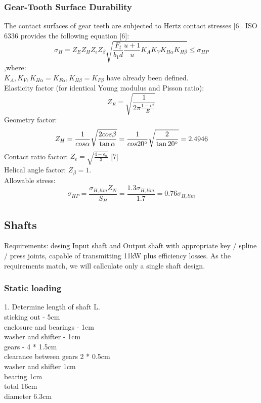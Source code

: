 \documentclass{article}
\begin{document}
\subsubsection{Gear-Tooth Surface Durability}
The contact surfaces of gear teeth are subjected to Hertz contact stresses [6].
ISO 6336 provides the following equation [6]: \\
\begin{equation}\sigma_H = Z_E Z_H Z_\epsilon Z_\beta \sqrt{\frac{F_t}{b_1 d}\frac{u + 1}{u} K_A K_V K_{H\alpha} K_{H\beta}} \leq \sigma_{HP} \end{equation}
,where: \\
$K_A, K_V, K_{H\alpha} = K_{F\alpha}, K_{H\beta} = K_{F\beta}$ have already been defined. \\
Elasticity factor (for identical Young modulus and Pisson ratio):
$$Z_E = \sqrt{\frac{1}{2 \pi \frac{1 - \upsilon^2}{E}}}$$
Geometry factor:
$$ Z_H = \frac{1}{cos \alpha}\sqrt{\frac{2 cos \beta}{\tan \alpha}} =  \frac{1}{cos 20 \degree}\sqrt{\frac{2}{\tan 20 \degree}} = 2.4946$$
Contact ratio factor: $Z_\epsilon = \sqrt{\frac{4 - \epsilon_\alpha}{3}}$ [7]\\
Helical angle factor: $Z_\beta = 1$. \\
Allowable stress:
$$ \sigma_{HP} = \frac{\sigma_{H, lim} Z_N}{S_H} =  \frac{1.3 \sigma_{H, lim}}{1.7} = 0.76\sigma_{H, lim} $$

\subsection{Shafts}
Requirements: desing Input shaft and Output shaft with appropriate key / spline / press  joints, capable of transmitting 11kW plus efficiency losses.
As the requirements match, we will callculate only a single shaft design.
\subsubsection{Static loading}
1. Determine length of shaft L. \\
sticking out - 5cm \\
enclosure and bearings - 1cm \\
washer and shifter - 1cm \\
gears - 4 * 1.5cm \\
clearance between gears 2 * 0.5cm \\
washer and shifter 1cm \\
bearing 1cm \\
total 16cm \\
diameter 6.3cm \\ [1cm]
\end{document}

